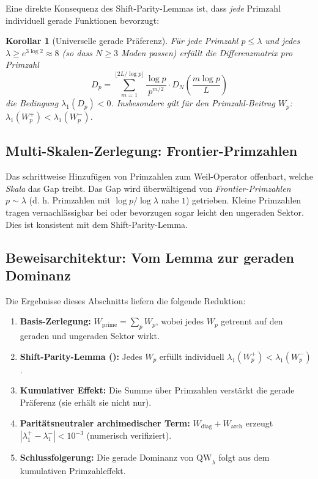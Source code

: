 \documentclass[12pt,a4paper]{article}
\newtheorem{corollary}[theorem]{Korollar}
\theoremstyle{definition}
\theoremstyle{remark}
\begin{document}
Eine direkte Konsequenz des Shift-Parity-Lemmas ist, dass \emph{jede} Primzahl individuell gerade Funktionen bevorzugt:

\begin{corollary}[Universelle gerade Präferenz]
\label{cor:universal}
Für jede Primzahl $p \leq \lambda$ und jedes $\lambda \geq e^{3\log 2} \approx 8$ (so dass $N \geq 3$ Moden passen) erfüllt die Differenzmatrix pro Primzahl
\[
  D_p = \sum_{m=1}^{\lfloor 2L/\log p \rfloor} \frac{\log p}{p^{m/2}} \cdot D_N\!\left(\frac{m\log p}{L}\right)
\]
die Bedingung $\lambda_1(D_p) < 0$. Insbesondere gilt für den Primzahl-Beitrag $W_p$: $\lambda_1(W_p^+) < \lambda_1(W_p^-)$.
\end{corollary}

\subsection{Multi-Skalen-Zerlegung: Frontier-Primzahlen}
\label{sec:frontier}

Das schrittweise Hinzufügen von Primzahlen zum Weil-Operator offenbart, welche \emph{Skala} das Gap treibt. Das Gap wird überwältigend von \emph{Frontier-Primzahlen} $p \sim \lambda$ (d. h. Primzahlen mit $\log p / \log\lambda$ nahe $1$) getrieben. Kleine Primzahlen tragen vernachlässigbar bei oder bevorzugen sogar leicht den ungeraden Sektor. Dies ist konsistent mit dem Shift-Parity-Lemma.

\subsection{Beweisarchitektur: Vom Lemma zur geraden Dominanz}

Die Ergebnisse dieses Abschnitts liefern die folgende Reduktion:
\begin{enumerate}
  \item \textbf{Basis-Zerlegung:} $W_{\mathrm{prime}} = \sum_p W_p$, wobei jedes $W_p$ getrennt auf den geraden und ungeraden Sektor wirkt.
  \item \textbf{Shift-Parity-Lemma ():} Jedes $W_p$ erfüllt individuell $\lambda_1(W_p^+) < \lambda_1(W_p^-)$.
  \item \textbf{Kumulativer Effekt:} Die Summe über Primzahlen verstärkt die gerade Präferenz (sie erhält sie nicht nur).
  \item \textbf{Paritätsneutraler archimedischer Term:} $W_{\mathrm{diag}} + W_{\mathrm{arch}}$ erzeugt $|\lambda_1^+ - \lambda_1^-| < 10^{-3}$ (numerisch verifiziert).
  \item \textbf{Schlussfolgerung:} Die gerade Dominanz von $\mathrm{QW}_\lambda$ folgt aus dem kumulativen Primzahleffekt.
\end{enumerate}
\end{document}
